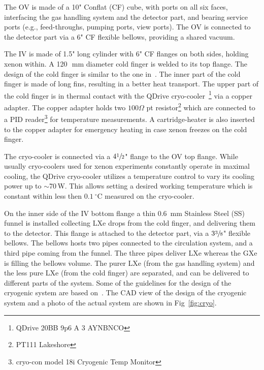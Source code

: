 The OV is made of a 10" Conflat (CF) cube, with ports on all six faces, interfacing the gas handling system and  the detector part, and bearing service ports (e.g., feed-throughs, pumping ports, 
view ports). The OV is connected to the detector part via a 6" CF flexible bellows, providing a shared vacuum.

The IV is made of 1.5" long cylinder with 6" CF flanges on both sides, holding xenon within. A 120~\,mm diameter cold finger is welded to its top flange. The design of the cold finger is similar to the one in~\cite{xe100_instr2012}. The inner part of the cold finger is made of long fins, resulting in a better heat transport.  The upper part of the cold finger is in thermal contact with the 
QDrive cryo-cooler~\footnote{QDrive 20BB 9p6 A 3 AYNBNCO} via a copper adapter. The copper adapter 
holds two $100\Omega$ pt resistor\footnote{PT111 Lakeshore} which are connected to a PID reader\footnote{cryo-con model 
18i Cryogenic Temp Monitor} for temperature measurements. A cartridge-heater 
is also inserted to the copper adapter for emergency heating in case xenon freezes on the 
cold finger. 

The cryo-cooler is connected via a $4\sfrac{1}{2}$" 
flange to the OV top flange. While usually cryo-coolers used for 
xenon experiments constantly operate in maximal cooling, the QDrive cryo-cooler utilizes a 
temperature control to vary its cooling power up to $\sim$70\,W. This allows setting a desired working temperature which is constant within less then $0.1~\mathrm{^{\circ}C}$ measured on the cryo-cooler.

On the inner side of the IV bottom flange a thin 0.6~mm Stainless Steel (SS) funnel is installed 
collecting LXe drops from the cold finger, and delivering them to the  detector. This flange is attached to the detector part, via a $3\sfrac{3}{8}$" flexible bellows. The 
bellows hosts two pipes connected to the circulation system, and a third pipe coming 
from the funnel. The three pipes deliver LXe whereas the GXe is filling the bellows volume. The purer LXe (from the gas handling system) and the less pure LXe (from the cold finger) are separated, and can be delivered to different parts of the system. Some of the guidelines for the design of 
the cryogenic system are based on~\cite{Giboni:2014hia}. The CAD view of 
the design of the cryogenic system and a photo of the actual system are shown in Fig~\ref{fig:cryo}. 

